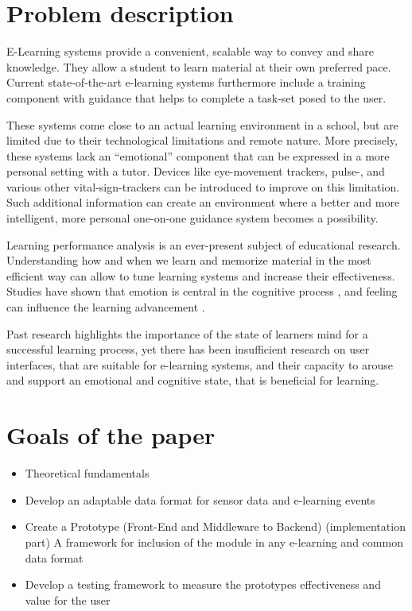 \section {Problem description}

E-Learning systems provide a convenient, scalable way to convey and share knowledge. They allow a student to learn material at their own preferred pace. 
Current state-of-the-art e-learning systems furthermore include a training component with guidance that helps to complete a task-set posed to the user.

These systems come close to an actual learning environment in a school, but are limited due to their technological limitations and remote nature. More precisely, these systems lack an “emotional” component that can be expressed in a more personal setting with a tutor. Devices like eye-movement trackers, pulse-, and various other vital-sign-trackers can be introduced to improve on this limitation. Such additional information can create an environment where a better and more intelligent, more personal one-on-one guidance system becomes a possibility.

Learning performance analysis is an ever-present subject of educational research. Understanding how and when we learn and memorize material in the most efficient way can allow to tune learning systems and increase their effectiveness. Studies have shown that emotion is central in the cognitive process \cite{ORegan2003}, and feeling can influence the learning advancement \cite{Hawkins2017}.

Past research highlights the importance of the state of learners mind for a successful learning process, yet there has been insufficient research on user interfaces, that are suitable for e-learning systems, and their capacity to arouse and support an emotional and cognitive state, that is beneficial for learning.


\section{Goals of the paper}

\begin{itemize}
	\item Theoretical fundamentals
	\item Develop an adaptable data format for sensor data and e-learning events 
	\item Create a Prototype (Front-End and Middleware to Backend) (implementation part)
	\subitem[-] A framework for inclusion of the module in any e-learning and common data format
	\item Develop a testing framework to measure the prototypes effectiveness and value for the user
\end{itemize}

